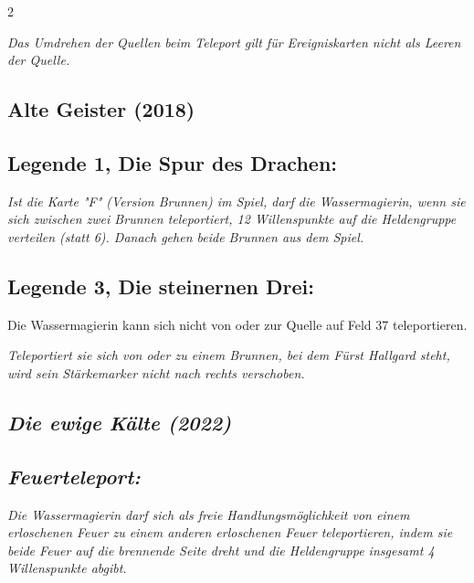 \documentclass[10pt, a4paper, oneside]{book}
\newcommand{\fan}[1]{\textit{#1}}
\begin{document}
\begin{multicols*}{2}
\begin{bgcolor}
\fan{Das Umdrehen der Quellen beim Teleport gilt für Ereigniskarten nicht als Leeren der Quelle.}



\end{bgcolor}





\begin{bgcolor}[color-ag]
\section{Alte Geister (2018)}


\subsection{Legende 1, Die Spur des Drachen:}

\fan{Ist die Karte "F" (Version Brunnen) im Spiel, darf die Wassermagierin, wenn sie sich zwischen zwei Brunnen teleportiert, 12 Willenspunkte auf die Heldengruppe verteilen (statt 6). Danach gehen beide Brunnen aus dem Spiel.}



\subsection{Legende 3, Die steinernen Drei:}

Die Wassermagierin kann sich nicht von oder zur Quelle auf Feld 37 teleportieren.
\supercite{ag-begleitheft}

\fan{Teleportiert sie sich von oder zu einem Brunnen, bei dem Fürst Hallgard steht, wird sein Stärkemarker nicht nach rechts verschoben.}



\end{bgcolor}





\begin{bgcolor}
\section{\fan{Die ewige Kälte (2022)}}

\subsection{\fan{Feuerteleport:}}

\fan{Die Wassermagierin darf sich als freie Handlungsmöglichkeit von einem erloschenen Feuer zu einem anderen erloschenen Feuer teleportieren, indem sie beide Feuer auf die brennende Seite dreht und die Heldengruppe insgesamt 4 Willenspunkte abgibt.} 


\end{bgcolor}
\end{multicols*}
\end{document}
